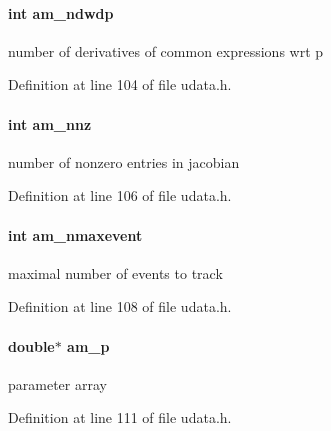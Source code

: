 \hypertarget{struct_user_data_a87a3b720bf2ea277332fa3b35f5875a4}{}
\paragraph[{am\+\_\+ndwdp}]{\setlength{\rightskip}{0pt plus 5cm}int am\+\_\+ndwdp}\label{struct_user_data_a87a3b720bf2ea277332fa3b35f5875a4}
number of derivatives of common expressions wrt p 

Definition at line 104 of file udata.\+h.

\hypertarget{struct_user_data_a43ad1c7f840dc744be4251902a4ae91d}{}
\paragraph[{am\+\_\+nnz}]{\setlength{\rightskip}{0pt plus 5cm}int am\+\_\+nnz}\label{struct_user_data_a43ad1c7f840dc744be4251902a4ae91d}
number of nonzero entries in jacobian 

Definition at line 106 of file udata.\+h.

\hypertarget{struct_user_data_adfa3a6bf6b41a27f98cac31557e6930f}{}
\paragraph[{am\+\_\+nmaxevent}]{\setlength{\rightskip}{0pt plus 5cm}int am\+\_\+nmaxevent}\label{struct_user_data_adfa3a6bf6b41a27f98cac31557e6930f}
maximal number of events to track 

Definition at line 108 of file udata.\+h.

\hypertarget{struct_user_data_a1a679b0e8dfea7d284d777c937d8d13e}{}
\paragraph[{am\+\_\+p}]{\setlength{\rightskip}{0pt plus 5cm}double$\ast$ am\+\_\+p}\label{struct_user_data_a1a679b0e8dfea7d284d777c937d8d13e}
parameter array 

Definition at line 111 of file udata.\+h.

\hypertarget{struct_user_data_a7b59855746129befdcfe9f3c8a4d2a4c}{}
